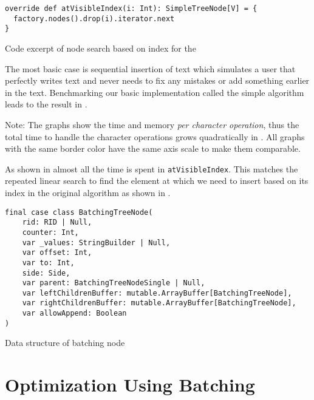 
\begin{listing}
  \begin{verbatim}
override def atVisibleIndex(i: Int): SimpleTreeNode[V] = {
  factory.nodes().drop(i).iterator.next
}
\end{verbatim}
  \caption{Code excerpt of node search based on index for the \protect{}}
  \label{lst:simple-at-visible-index}
\end{listing}



The most basic case is sequential insertion of text which simulates a user that perfectly writes text and never needs to fix any mistakes or add something earlier in the text. Benchmarking our basic implementation called the \gls{simple algorithm} leads to the result in .

Note: The graphs show the time and memory \textit{per character operation}, thus the total time to handle the character operations grows quadratically in . All graphs with the same border color have the same axis scale to make them comparable.

As shown in  almost all the time is spent in \texttt{atVisibleIndex}. This matches the repeated linear search to find the element at which we need to insert based on its index in the original algorithm as shown in .

\begin{listing}
  \begin{verbatim}
final case class BatchingTreeNode(
    rid: RID | Null,
    counter: Int,
    var _values: StringBuilder | Null,
    var offset: Int,
    var to: Int,
    side: Side,
    var parent: BatchingTreeNodeSingle | Null,
    var leftChildrenBuffer: mutable.ArrayBuffer[BatchingTreeNode],
    var rightChildrenBuffer: mutable.ArrayBuffer[BatchingTreeNode],
    var allowAppend: Boolean
)
\end{verbatim}
  \caption{Data structure of batching node}
  \label{lst:data-structure-batching-node}
\end{listing}

\clearpage

\section{Optimization Using Batching} \label{sec:optimization-batching}

